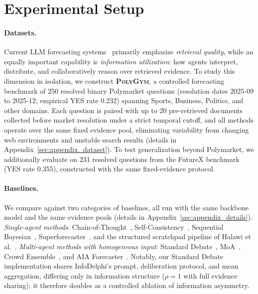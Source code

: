 \section{Experimental Setup}
\label{sec:setup}

\paragraph{Datasets.}
Current LLM forecasting systems~\citep{halawi2024approaching,turtel2025llms} primarily emphasize \textit{retrieval quality}, while an equally important capability is \textit{information utilization}: how agents interpret, distribute, and collaboratively reason over retrieved evidence.
To study this dimension in isolation, we construct \textbf{\textsc{PolyGym}}, a controlled forecasting benchmark of 250 resolved binary Polymarket questions (resolution dates 2025-09 to 2025-12; empirical YES rate 0.232) spanning Sports, Business, Politics, and other domains.
Each question is paired with up to 20 pre-retrieved documents collected before market resolution under a strict temporal cutoff, and all methods operate over the same fixed evidence pool, eliminating variability from changing web environments and unstable search results (details in Appendix~\ref{sec:appendix_dataset}).
To test generalization beyond Polymarket, we additionally evaluate on 231 resolved questions from the FutureX benchmark~\citep{zeng2025futurex} (YES rate 0.355), constructed with the same fixed-evidence protocol.

\paragraph{Baselines.}
We compare against two categories of baselines, all run with the same backbone model and the same evidence pools (details in Appendix~\ref{sec:appendix_details}).
 \textit{Single-agent methods}: Chain-of-Thought~\citep{wei2022chain}, Self-Consistency~\citep{wangself}, Sequential Bayesian~\citep{shi2023language}, Superforecaster~\citep{karger2024forecastbench}, and the structured scratchpad pipeline of Halawi et al.~\citep{halawi2024approaching}.
 \textit{Multi-agent methods with homogeneous input}: Standard Debate~\citep{du2023improving}, MoA~\citep{wangmixture}, Crowd Ensemble~\citep{schoenegger2024wisdom}, and AIA Forecaster~\citep{alur2025aia}.
Notably, our Standard Debate implementation shares InfoDelphi's prompt, deliberation protocol, and mean aggregation, differing only in information structure ($\rho{=}1$ with full evidence sharing); it therefore doubles as a controlled ablation of information asymmetry.

